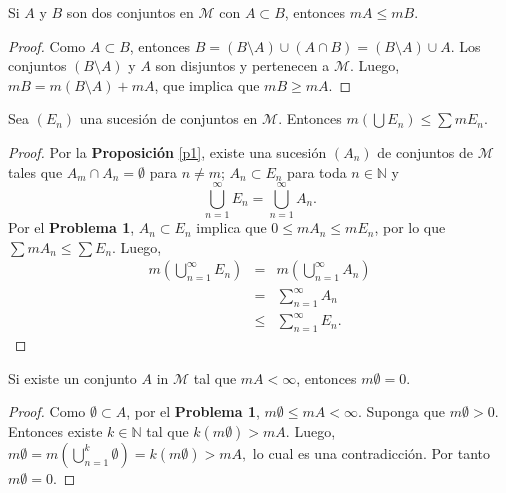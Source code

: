 \documentclass[12pt]{article}
\newcommand{\N}{\mathbb{N}}
\newcommand{\M}{\mathcal{M}}
\newenvironment{problem}[2][Problema]{\begin{trivlist}
\item[\hskip \labelsep {\bfseries #1}\hskip \labelsep {\bfseries #2.}]}{\end{trivlist}}
\begin{document}
\begin{problem}{1}
Si $A$ y $B$ son dos conjuntos en $\mathcal{M}$ con $A \subset B$, entonces $m A \leq m B.$

\end{problem}

\begin{proof}
Como $A \subset B$, entonces $B = (B\setminus A ) \cup (A \cap B) = (B\setminus A ) \cup A $. Los conjuntos $(B\setminus A ) $ y $A$ son disjuntos y pertenecen a $\mathcal{M}$. Luego,  $m B = m (B\setminus A)  + m A$, que implica que $m B \geq m A.$
\end{proof}


\begin{problem}{2}
Sea $(E_n)$ una sucesión de conjuntos en $\M$. Entonces $m(\bigcup E_n) \leq \sum m E_n$.
\end{problem}

\begin{proof}
Por la \textbf{Proposición} \ref{p1}, existe una sucesión $(A_n)$ de conjuntos de $\M$ tales que $A_m \cap A_n = \emptyset$ para $n \neq m$; $A_n \subset E_n$ para toda $n\in \N$ y 
$$\bigcup_{n=1}^{\infty}E_n = \bigcup_{n=1}^{\infty}A_n.$$
Por el \textbf{Problema 1}, $A_n \subset E_n$ implica que $0 \leq m A_n \leq m E_n$, por lo que $\sum m A_n \leq \sum E_n.$ Luego, 
\begin{eqnarray*}
m \left(\bigcup_{n=1}^{\infty}E_n\right) &=& m \left( \bigcup_{n=1}^{\infty}A_n \right)\\
&=& \sum_{n=1}^{\infty} A_n \\
&\leq&  \sum_{n=1}^{\infty} E_n.
\end{eqnarray*}

\end{proof}


\begin{problem}{3}
Si existe un conjunto $A$ in $\M$ tal que $m A < \infty$, entonces $m \emptyset = 0$. 
\end{problem}
\begin{proof}
Como $\emptyset \subset A$, por el \textbf{Problema 1}, $m \emptyset \leq m A < \infty.$ Suponga que $m \emptyset > 0$. Entonces existe $k \in \N$ tal que $k (m \emptyset) > m A.$ Luego, $m \emptyset =  m (\bigcup_{n=1}^{k} \emptyset) = k (m \emptyset) > m A,$ lo cual es una contradicción. Por tanto $m \emptyset = 0.$

\end{proof}
\end{document}
